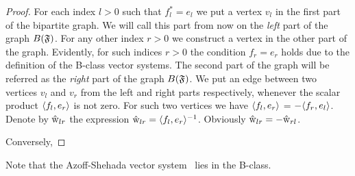\documentclass[12pt]{article}
\begin{document}
    \begin{proof}
      For each index $l > 0$ such that $f^*_l = e_l$ we put a vertex $v_l$ in the first part of the bipartite graph.
      We will call this part from now on the \emph{left} part of the graph $B(\mathfrak{F})$.
      For any other index $r > 0$ we construct a vertex in the other part of the graph.
      Evidently, for such indices $r > 0$ the condition $f_r = e_r$ holds due to the definition of the B-class vector systems.
      The second part of the graph will be referred as the \emph{right} part of the graph $B(\mathfrak{F})$.
      We put an edge between two vertices $v_l$ and $v_r$ from the left and right parts respectively,
      whenever the scalar product $\langle f_l, e_r \rangle$ is not zero.
      For such two vertices we have $\langle f_l, e_r \rangle$ = $-\langle f_r, e_l \rangle$.
      Denote by $\mathrm{\hat{w}}_{lr}$ the expression $\mathrm{\hat{w}}_{lr} = \langle f_l, e_r \rangle^{-1}$.
      Obviously $\mathrm{\hat{w}}_{lr} = -\mathrm{\hat{w}}_{rl}$.

      Conversely,
    \end{proof}
    \begin{remark}
      Note that the Azoff-Shehada vector system~\cite{azoff} lies in the B-class.
    \end{remark}
\end{document}
